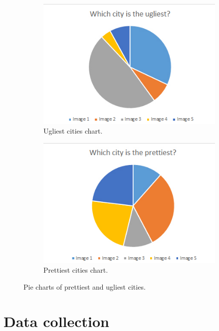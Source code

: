 	\begin{figure}[h]
		\begin{subfigure}{0.5\textwidth}
			\centering
			\includegraphics[width=0.9\linewidth]{"Images/Ugliest"}
			\caption{Ugliest cities chart.}
			\label{fig:pie-chart-ugly}
		\end{subfigure}
		\begin{subfigure}{0.5\textwidth}
			\centering
			\includegraphics[width=0.9\linewidth]{"Images/Prettiest"}
			\caption{Prettiest cities chart.}
			\label{fig:pie-chart-pretty}
		\end{subfigure}
		\caption{Pie charts of prettiest and ugliest cities.}
		\label{fig:pie-chart-ugly-pretty}
	\end{figure}


\newpage
\section{Data collection \label{section:DataCollection}}

